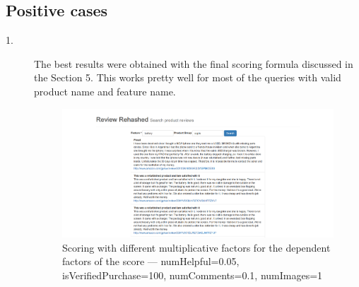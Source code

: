\documentclass{article}
\begin{document}
\subsection{Positive cases}
			\begin{description}
				\item[1.] The best results were obtained with the final scoring formula discussed in the Section 5. This works pretty well for most of the queries with valid product name and feature name.
					\begin{figure}[ht!]
					  \centering
					  \includegraphics[width=1\textwidth]{scoring_piecewise_normalization}
					  \caption{Scoring with different multiplicative factors for the dependent factors of the score --- numHelpful=0.05, isVerifiedPurchase=100, numComments=0.1, numImages=1~\label{fig:Search_Engine}}
					\end{figure}
			\end{description}
\end{document}

